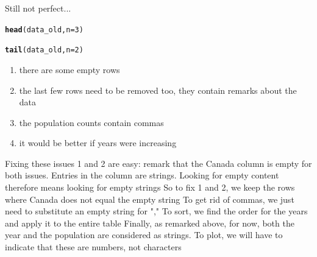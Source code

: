 \documentclass[aspectratio=169]{beamer}\usepackage[]{graphicx}\usepackage[]{xcolor}
\makeatletter
\newcommand{\hlnum}[1]{\textcolor[rgb]{0.686,0.059,0.569}{#1}}%
\newcommand{\hldef}[1]{\textcolor[rgb]{0.345,0.345,0.345}{#1}}%
\newcommand{\hlkwc}[1]{\textcolor[rgb]{0.333,0.667,0.333}{#1}}%
\newcommand{\hlkwd}[1]{\textcolor[rgb]{0.737,0.353,0.396}{\textbf{#1}}}%
\newenvironment{kframe}{%
 \def\at@end@of@kframe{}%
 \ifinner\ifhmode%
  \def\at@end@of@kframe{\end{minipage}}%
  \begin{minipage}{\columnwidth}%
 \fi\fi%
 \def\FrameCommand##1{\hskip\@totalleftmargin \hskip-\fboxsep
 \colorbox{shadecolor}{##1}\hskip-\fboxsep
     \hskip-\linewidth \hskip-\@totalleftmargin \hskip\columnwidth}%
 \MakeFramed {\advance\hsize-\width
   \@totalleftmargin\z@ \linewidth\hsize
   \@setminipage}}%
 {\par\unskip\endMakeFramed%
 \at@end@of@kframe}
\newenvironment{knitrout}{}{} %
\makeatother
\begin{document}
\begin{frame}[fragile]{Still not perfect...}
\begin{knitrout}
\color{fgcolor}\begin{kframe}
\begin{alltt}
\hlkwd{head}\hldef{(data_old,} \hlkwc{n}\hldef{=}\hlnum{3}\hldef{)}
\end{alltt}


{\ttfamily\noindent\bfseries\color{errorcolor}{\#\# Error in `h()`:\\\#\# ! error in evaluating the argument 'x' in selecting a method for function 'head': object 'data\_old' not found}}\begin{alltt}
\hlkwd{tail}\hldef{(data_old,} \hlkwc{n}\hldef{=}\hlnum{2}\hldef{)}
\end{alltt}


{\ttfamily\noindent\bfseries\color{errorcolor}{\#\# Error in `h()`:\\\#\# ! error in evaluating the argument 'x' in selecting a method for function 'tail': object 'data\_old' not found}}\end{kframe}
\end{knitrout}
\begin{enumerate}
\item there are some empty rows
\vfill
\item the last few rows need to be removed too, they contain remarks about the data
\vfill
\item the population counts contain commas
\vfill
\item it would be better if years were increasing
\end{enumerate}
\end{frame}

\begin{frame}{Fixing these issues}
1 and 2 are easy: remark that the Canada column is empty for both issues. Entries in the column are strings. Looking for empty content therefore means looking for empty strings
\vfill
So to fix 1 and 2, we keep the rows where Canada does not equal the empty string
\vfill
To get rid of commas, we just need to substitute an empty string for ","
\vfill
To sort, we find the order for the years and apply it to the entire table
\vfill
Finally, as remarked above, for now, both the year and the population are considered as strings. To plot, we will have to indicate that these are numbers, not characters
\end{frame}
\end{document}
